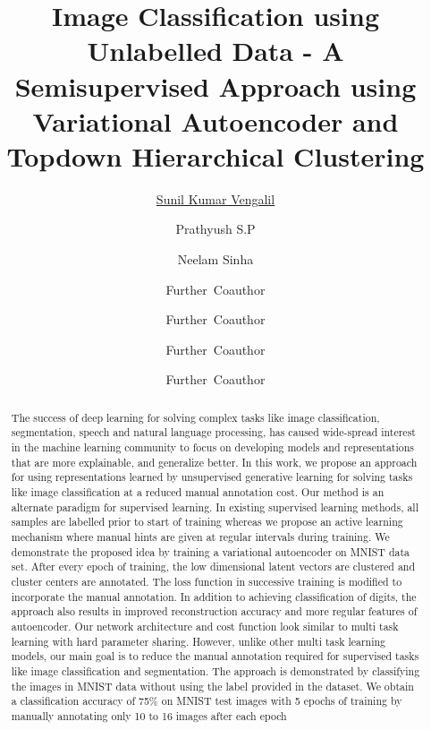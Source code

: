 \documentclass{uai2021} %
\title{Image Classification using Unlabelled Data - A Semisupervised Approach using Variational Autoencoder and Topdown Hierarchical Clustering}
\author[1]{\href{mailto:Sunil Kumar Vengalil <sunilkumar.vengalil@iiitb.org> ?Subject=Your UAI 2021 paper}{Sunil Kumar Vengalil}{}}
\author[2]{Prathyush S.P}
\author[1,2]{Neelam Sinha}
\author[3]{Further~Coauthor}
\author[1]{Further~Coauthor}
\author[3]{Further~Coauthor}
\author[3,1]{Further~Coauthor}
\affil[1]{%
    Computer Science Dept.\\
    Cranberry University\\
    Pittsburgh, Pennsylvania, USA
}
\affil[2]{%
    Affiliation\\
    Address\\
    …
}
\affil[3]{…}
\begin{document}
\maketitle

\begin{abstract}
The success of deep learning for solving complex tasks like image classification, segmentation, speech and natural language processing, has caused wide-spread interest in the machine learning community to focus on developing models and representations that are more explainable, and generalize better.
In this work, we propose an approach for using representations learned by unsupervised generative learning for solving tasks like image classification at a reduced manual annotation cost.
Our method is an alternate paradigm for supervised learning.
In existing supervised learning methods,  all samples are labelled prior to start of training whereas we propose an active learning mechanism where manual hints are given at regular intervals during training.
We demonstrate the proposed idea by training a  variational autoencoder on MNIST data set.
After every epoch of training, the low dimensional latent vectors are clustered and cluster centers are annotated.
The loss function in successive training is modified to incorporate the manual annotation.
In addition to achieving classification of digits, the approach also results in improved reconstruction accuracy and more regular features of autoencoder.
Our network architecture and cost function look similar to multi task learning with hard parameter sharing.
However, unlike other multi task learning models, our main goal is to reduce the manual annotation required for supervised tasks like image classification and segmentation.
The approach is demonstrated by classifying the images in MNIST data without using the label provided in the dataset.
We obtain a classification accuracy of 75\% on MNIST test images with 5 epochs of training by manually annotating only 10 to 16 images after each epoch
\end{abstract}
\end{document}
